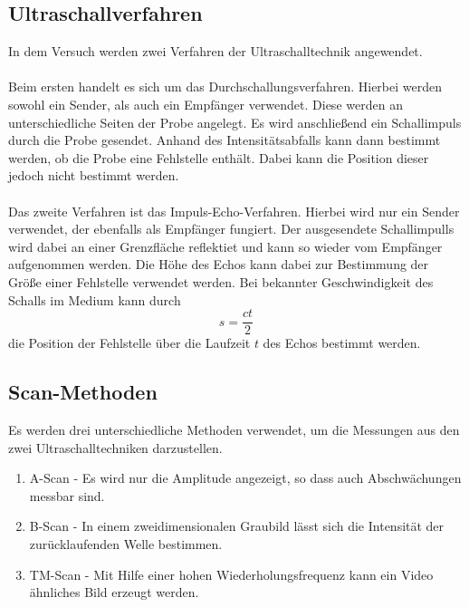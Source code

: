 \subsection{Ultraschallverfahren}
\label{sec:Ultraschallverfahren}
In dem Versuch werden zwei Verfahren der Ultraschalltechnik angewendet.\\ \\
Beim ersten handelt es sich um das Durchschallungsverfahren. Hierbei werden sowohl ein Sender, als auch ein Empfänger verwendet. Diese werden an unterschiedliche
Seiten der Probe angelegt. Es wird anschließend ein Schallimpuls durch die Probe gesendet. Anhand des Intensitätsabfalls kann dann bestimmt werden, ob die Probe eine
Fehlstelle enthält. Dabei kann die Position dieser jedoch nicht bestimmt werden.\\ \\
Das zweite Verfahren ist das Impuls-Echo-Verfahren. Hierbei wird nur ein Sender verwendet, der ebenfalls als Empfänger fungiert. Der ausgesendete Schallimpulls wird dabei
an einer Grenzfläche reflektiet und kann so wieder vom Empfänger aufgenommen werden. Die Höhe des Echos kann dabei zur Bestimmung der Größe einer Fehlstelle verwendet
werden. Bei bekannter Geschwindigkeit des Schalls im Medium kann durch
\begin{equation}
    \label{eqn:Strecke}
    s = \frac{ct}{2}
\end{equation}
die Position der Fehlstelle über die Laufzeit $t$ des Echos bestimmt werden.


\subsection{Scan-Methoden}
\label{sec:Scan}
Es werden drei unterschiedliche Methoden verwendet, um die Messungen aus den zwei Ultraschalltechniken darzustellen.
\begin{enumerate}
    \item A-Scan - Es wird nur die Amplitude angezeigt, so dass auch Abschwächungen messbar sind.
    \item B-Scan - In einem zweidimensionalen Graubild lässt sich die Intensität der zurücklaufenden Welle bestimmen.
    \item TM-Scan - Mit Hilfe einer hohen Wiederholungsfrequenz kann ein Video ähnliches Bild erzeugt werden.
\end{enumerate}